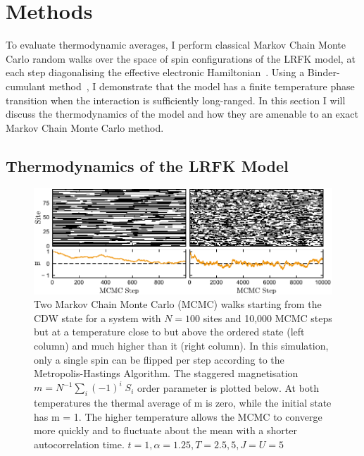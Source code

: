 \hypertarget{sec:lrfk-methods}{%
\section{Methods}\label{sec:lrfk-methods}}

To evaluate thermodynamic averages, I perform classical Markov Chain Monte Carlo random walks over the space of spin configurations of the LRFK model, at each step diagonalising the effective electronic Hamiltonian~\autocite{maskaThermodynamicsTwodimensionalFalicovKimball2006}. Using a Binder-cumulant method~\autocite{binderFiniteSizeScaling1981,musialMonteCarloSimulations2002}, I demonstrate that the model has a finite temperature phase transition when the interaction is sufficiently long-ranged. In this section I will discuss the thermodynamics of the model and how they are amenable to an exact Markov Chain Monte Carlo method.

\hypertarget{thermodynamics-of-the-lrfk-model}{%
\subsection{Thermodynamics of the LRFK Model}\label{thermodynamics-of-the-lrfk-model}}

\hypertarget{fig:raw_steps_single_flip}{%
\begin{figure}
\centering
\includegraphics[width=1\textwidth,height=\textheight]{figure_code/fk_chapter/raw_steps_single_flip}
\caption[{Comparison of different proposal distributions}]{Two Markov Chain Monte Carlo (MCMC) walks starting from the CDW state for a system with \(N = 100\) sites and 10,000 MCMC steps but at a temperature close to but above the ordered state (left column) and much higher than it (right column). In this simulation, only a single spin can be flipped per step according to the Metropolis-Hastings Algorithm. The staggered magnetisation \(m = N^{-1} \sum_i (-1)^i \; S_i\) order parameter is plotted below. At both temperatures the thermal average of m is zero, while the initial state has m = 1. The higher temperature allows the MCMC to converge more quickly and to fluctuate about the mean with a shorter autocorrelation time. \(t = 1, \alpha = 1.25, T = {2.5,5}, J = U = 5\)}
\label{fig:raw_steps_single_flip}
\end{figure}
}

